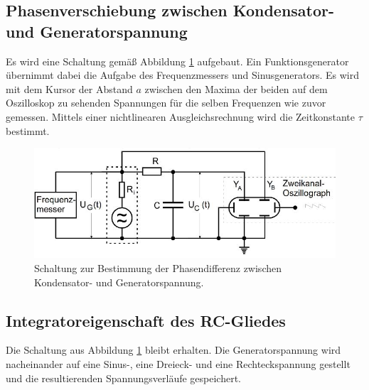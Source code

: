 \subsection{Phasenverschiebung zwischen Kondensator- und Generatorspannung}
Es wird eine Schaltung gemäß Abbildung \ref{fig:c} aufgebaut. Ein Funktionsgenerator übernimmt dabei die Aufgabe des Frequenzmessers und Sinusgenerators. Es wird mit dem Kursor der Abstand $a$ zwischen den Maxima der beiden auf dem Oszilloskop zu sehenden Spannungen für die selben Frequenzen wie zuvor gemessen. Mittels einer nichtlinearen Ausgleichsrechnung wird die Zeitkonstante $\tau$ bestimmt.
\begin{figure}
\centering
\includegraphics[width=\linewidth-70pt,height=\textheight-70pt,keepaspectratio]{content/images/c.jpg}
\caption{Schaltung zur Bestimmung der Phasendifferenz zwischen Kondensator- und Generatorspannung.\cite{V353}}
\label{fig:c}
\end{figure}
\subsection{Integratoreigenschaft des RC-Gliedes}
Die Schaltung aus Abbildung \ref{fig:c} bleibt erhalten.
Die Generatorspannung wird nacheinander auf eine Sinus-, eine Dreieck- und eine Rechteckspannung gestellt und die resultierenden Spannungsverläufe gespeichert.